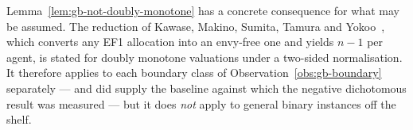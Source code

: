 \begin{remark}
\label{rem:gb-no-baseline}
Lemma~\ref{lem:gb-not-doubly-monotone} has a concrete consequence for what may
be assumed. The reduction of Kawase, Makino, Sumita, Tamura and
Yokoo~\cite{KMSTY24}, which converts any EF1 allocation into an envy-free one
and yields $n-1$ per agent, is stated for doubly monotone valuations under a
two-sided normalisation. It therefore applies to each boundary class of
Observation~\ref{obs:gb-boundary} separately --- and did supply the baseline
against which the negative dichotomous result was measured --- but it does
\emph{not} apply to general binary instances off the shelf.
\end{remark}
